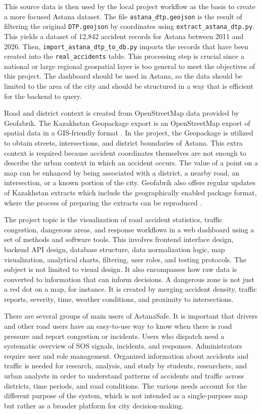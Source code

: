 ﻿\documentclass[12pt,a4paper]{report}
\begin{document}
This source data is then used by the local project workflow as the basis to create a more focused Astana dataset. The file \texttt{astana\_dtp.geojson} is the result of filtering the original \texttt{DTP.geojson} by coordinates using \texttt{extract\_astana\_dtp.py}. This yields a dataset of 12,842 accident records for Astana between 2011 and 2026. Then, \texttt{import\_astana\_dtp\_to\_db.py} imports the records that have been created into the \texttt{real\_accidents} table. This processing step is crucial since a national or large regional geospatial layer is too general to meet the objectives of this project. The dashboard should be used in Astana, so the data should be limited to the area of the city and should be structured in a way that is efficient for the backend to query.

Road and district context is created from OpenStreetMap data provided by Geofabrik. The Kazakhstan Geopackage export is an OpenStreetMap export of spatial data in a GIS-friendly format \cite{osmCopyright}. In the project, the Geopackage is utilized to obtain streets, intersections, and district boundaries of Astana. This extra context is required because accident coordinates themselves are not enough to describe the urban context in which an accident occurs. The value of a point on a map can be enhanced by being associated with a district, a nearby road, an intersection, or a known portion of the city. Geofabrik also offers regular updates of Kazakhstan extracts which include the geographically enabled package format, where the process of preparing the extracts can be reproduced \cite{geofabrikKazakhstan}.

The project topic is the visualization of road accident statistics, traffic congestion, dangerous areas, and response workflows in a web dashboard using a set of methods and software tools. This involves frontend interface design, backend API design, database structure, data normalization logic, map visualization, analytical charts, filtering, user roles, and testing protocols. The subject is not limited to visual design. It also encompasses how raw data is converted to information that can inform decisions. A dangerous zone is not just a red dot on a map, for instance. It is created by merging accident density, traffic reports, severity, time, weather conditions, and proximity to intersections.

There are several groups of main users of AstanaSafe. It is important that drivers and other road users have an easy-to-use way to know when there is road pressure and report congestion or incidents. Users who dispatch need a systematic overview of SOS signals, incidents, and responses. Administrators require user and role management. Organized information about accidents and traffic is needed for research, analysis, and study by students, researchers, and urban analysts in order to understand patterns of accidents and traffic across districts, time periods, and road conditions. The various needs account for the different purpose of the system, which is not intended as a single-purpose map but rather as a broader platform for city decision-making.
\end{document}
